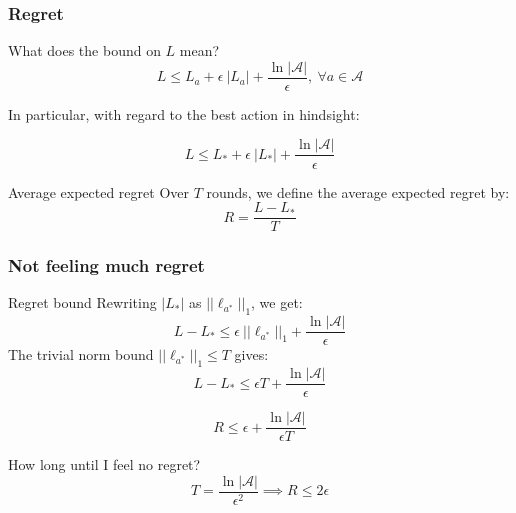 \documentclass{beamer}
\begin{document}
\begin{frame}
    \frametitle{Regret}

    \begin{block}{What does the bound on $L$ mean?}
    \begin{equation*}
    L \leq L_a + \epsilon~|L_a|
    +\frac{\ln |\mathcal{A}|}{\epsilon},~ \forall a\in \mathcal{A}
    \end{equation*}
    
    In particular, with regard to the best action in hindsight:

    \begin{equation*}
    L \leq L_* + \epsilon~|L_*| +\frac{\ln |\mathcal{A}|}{\epsilon}
    \end{equation*}
    \end{block}

    \begin{block}{Average expected regret}
        Over $T$ rounds, we define the average expected regret by:
        \begin{equation*}
            R = \frac{L - L_*}{T}
        \end{equation*}
    \end{block}

\end{frame}

\begin{frame}
    \frametitle{Not feeling much regret}

    \begin{block}{Regret bound}
        Rewriting $|L_*|$ as $||\ell_{a^*}||_1$, we get:
    \begin{equation*}
    L - L_* \leq \epsilon~||\ell_{a^*}||_1 + \frac{\ln |\mathcal{A}|}{\epsilon}
    \end{equation*}
    The trivial norm bound $||\ell_{a^*}||_1 \leq T$ gives:
    \begin{equation*}
    L - L_* \leq \epsilon T + \frac{\ln |\mathcal{A}|}{\epsilon}
    \end{equation*}

    \begin{equation*}
    R \leq \epsilon + \frac{\ln |\mathcal{A}|}{\epsilon T}
    \end{equation*}
    \end{block}

    \begin{block}{How long until I feel no regret?}
        \begin{equation*}
            T = \frac{\ln{|\mathcal{A}|}}{\epsilon^2} \implies R \leq 2
            \epsilon
        \end{equation*}

    \end{block}

\end{frame}
\end{document}
